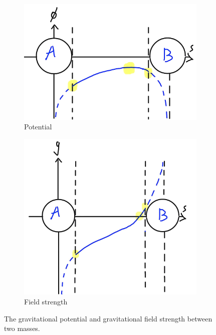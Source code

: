 \begin{figure}[H]
    \centering
    \begin{subfigure}{0.45\textwidth}
        \centering
        \includegraphics[width=\textwidth]{../images/Two-body-gravity/Potential.jpg}
        \caption{Potential}
        \label{fig:gravitational-potential}
    \end{subfigure}\hfill
    \begin{subfigure}{0.45\textwidth}
        \centering
        \includegraphics[width=\textwidth]{../images/Two-body-gravity/Field strength.jpg}
        \caption{Field strength}
        \label{fig:gravitational-field-strength}
    \end{subfigure}
    \caption{The gravitational potential and gravitational field strength between two masses.}
    \label{fig:two-body-gravity}
\end{figure}
